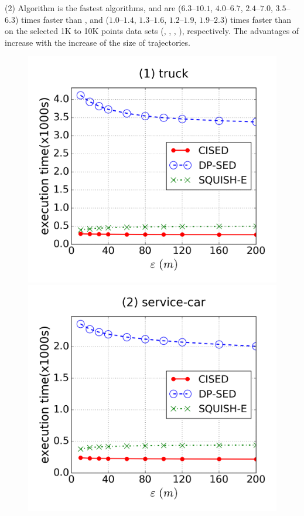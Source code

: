 \sstab(2) Algorithm \cist is the fastest \lsa algorithms, and are {($6.3$--$10.1$, $4.0$--$6.7$, $2.4$--$7.0$, $3.5$--$6.3$)} times faster than \dpa,
and {($1.0$--$1.4$, $1.3$--$1.6$, $1.2$--$1.9$, $1.9$--$2.3$)} times faster than \squishe on the selected 1K to 10K points data sets (\truck, \sercar, \geolife, \pricar), respectively.
The advantages of \cist increase with the increase of the size of trajectories.

\begin{figure}[tb!]
\centering
\includegraphics[scale = 0.25]{figures/Exp-time-epsilon-truck.png}
\includegraphics[scale = 0.25]{figures/Exp-time-epsilon-service.png}

\end{figure}
